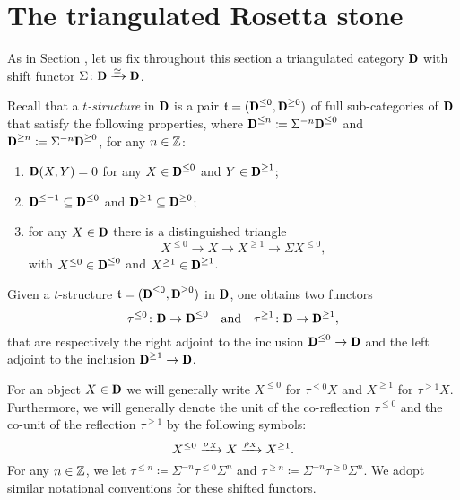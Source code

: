 \section{The triangulated Rosetta stone}\label{t_structure_subs}

As in Section , let us fix throughout this section a triangulated category $\cD$ with shift functor $\Sigma\colon \cD \xto{\simeq} \cD$.
\begin{definition}\label{def:teestru}
Recall that a \emph{$t$-structure} in $\cD$ is a pair $\t = (\cD^{\leq  0}, \cD^{\geq 0}  )$ of full sub-categories of $\cD$ that satisfy the following properties, where $\cD^{\leq n} \coloneqq \Sigma^{-n}\cD^{\leq 0}$ and $\cD^{\geq n} \coloneqq \Sigma^{-n} \cD^{\geq 0} $, for any $n\in\mathbb{Z}$:
\begin{enumerate}[label=t\arabic*)]
\item\label{tee:fst} $\cD(X,Y)=0$ for any $X \in \cD^{\leq  0}$ and $Y \in  \cD^{\geq  1} $;
\item\label{tee:snd} $\cD^{\leq-1}\subseteq \cD^{\leq  0}$ and $ \cD^{\geq 1} \subseteq  \cD^{\geq  0} $;
\item\label{tee:trd} for any $X \in \cD$ there is a distinguished triangle 
\[
X^{\leq0} \to X \to X^{\geq1}\to \Sigma X^{\leq0},
\] 
with $X^{\leq0} \in \cD^{\leq 0}$ and $X^{\geq1}\in  \cD^{\geq 1} $.
\end{enumerate}
\end{definition}
Given a $t$-structure $\t = (\cD^{\leq  0}, \cD^{\geq 0} )$ in $\cD$, one obtains two functors
\[
\tau^{\leq0}\colon \cD\to \cD^{\leq  0} \quad\text{and}\quad \tau^{\geq1}\colon \cD\to  \cD^{\geq  1} ,
\]
that are respectively the right adjoint to the inclusion $\cD^{\leq  0}\to \cD$ and the left adjoint to the inclusion $ \cD^{\geq  1} \to \cD$.


\begin{notat}
For an object $X\in\cD$ we will generally write $X^{\leq0}$ for $\tau^{\leq0}X$ and $X^{\geq1}$ for $\tau^{\geq1}X$. Furthermore, we will generally denote the unit of the co-reflection $\tau^{\leq0}$ and the co-unit of the reflection $\tau^{\geq1}$ by the following symbols: 
\[
X^{\leq0} \xrightarrow{\sigma_X} X \xrightarrow{\rho_X} X^{\geq1}.
\]
For any $n\in\mathbb{Z}$, we let $\tau^{\leq n} \coloneqq \Sigma^{-n}\tau^{\leq0}\Sigma^n$ and $\tau^{\geq n} \coloneqq \Sigma^{-n}\tau^{\geq0}\Sigma^n$. We adopt similar notational conventions for these shifted functors.
\end{notat}

